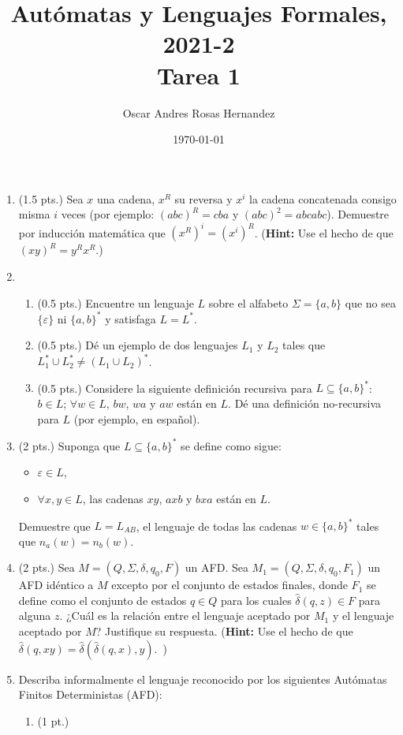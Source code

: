 \documentclass[letterpaper,12pt]{article}
\title{Autómatas y Lenguajes Formales, 2021-2 \\ Tarea 1}
\author{Oscar Andres Rosas Hernandez}
\date{\today}
\begin{document}
\maketitle

	
\begin{enumerate}
\item (1.5 pts.) Sea $x$ una cadena, $x^R$ su reversa y $x^i$ la cadena concatenada consigo misma $i$ veces (por ejemplo: $(abc)^R = cba$ y $(abc)^2=abcabc$). Demuestre por inducción matemática que $(x^R)^i=(x^i)^R$. ({\bf Hint:} Use el hecho de que $(xy)^R=y^Rx^R$.)

\item 
\begin{enumerate}
\item (0.5 pts.) Encuentre un lenguaje $L$ sobre el alfabeto $\Sigma = \{a,b\}$ que no sea $\{\varepsilon\}$ ni $\{a,b\}^*$ y satisfaga $L=L^*$.
\item (0.5 pts.) Dé un ejemplo de dos lenguajes $L_1$ y $L_2$ tales que $L_1^*\cup L_2^* \neq (L_1\cup L_2)^*$.
\item (0.5 pts.) Considere la siguiente definición recursiva para $L\subseteq\{a,b\}^*$: $b\in L$; $\forall w\in L$, $bw$, $wa$ y $aw$ están en $L$. Dé una definición no-recursiva para $L$ (por ejemplo, en español).
\end{enumerate}


\item (2 pts.) Suponga que $L\subseteq \{a,b\}^*$ se define como sigue:
   \begin{itemize}
   \item $\varepsilon \in L$,
   \item $\forall x,y\in L$, las cadenas $xy$, $axb$ y $bxa$  están en $L$.
   \end{itemize}
Demuestre que $L=L_{AB}$, el lenguaje de todas las cadenas $w\in\{a,b\}^*$ tales que $n_a(w)=n_b(w)$.

\item (2 pts.) Sea $M=(Q,\Sigma,\delta,q_0,F)$ un AFD. Sea $M_1=(Q,\Sigma,\delta,q_0,F_1)$ un AFD idéntico a $M$ excepto por el conjunto de estados finales, donde $F_1$ se define como el conjunto de estados $q\in Q$ para los cuales $\widehat{\delta}(q,z)\in F$ para alguna $z$. ¿Cuál es la relación entre el lenguaje aceptado por $M_1$ y el lenguaje aceptado por $M$? Justifique su respuesta. ({\bf Hint:} Use el hecho de que $\widehat{\delta}(q, xy) = \widehat{\delta}(\widehat{\delta}(q, x), y)
$.\ )


\newpage
\item Describa informalmente el lenguaje reconocido por los siguientes Autómatas Finitos Deterministas (AFD):
\begin{enumerate}
\item (1 pt.)
\begin{tikzpicture}[->,>=stealth',shorten >=1pt,%
auto,node distance=2.5cm,semithick,
inner sep=2pt,bend angle=45]


\end{tikzpicture}
\end{enumerate}
\end{enumerate}
\end{document}
